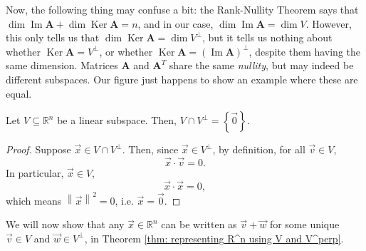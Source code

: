 \documentclass[]{book}
\DeclareMathOperator{\image}{Im}
\DeclareMathOperator{\kernel}{Ker}
\newcommand{\mat}[1]{\ensuremath{\mathbf{#1}}}
\newcommand{\R}{\ensuremath{\mathbb{R}}}
\begin{document}
Now, the following thing may confuse a bit: the Rank-Nullity Theorem says that $\dim\image\mat{A} + \dim\kernel\mat{A} = n$, and in our case, $\dim\image\mat{A} = \dim V$. However, this only tells us that $\dim\kernel\mat{A} = \dim V^{\perp}$, but it tells us nothing about whether $\kernel\mat{A} = V^{\perp}$, or whether $\kernel\mat{A} = \left(\image\mat{A}\right)^{\perp}$, despite them having the same dimension. Matrices $\mat{A}$ and $\mat{A}^T$ share the same \textit{nullity}, but may indeed be different subspaces. Our figure just happens to show an example where these are equal.


\begin{theorem}
    \label{thm: intersection of a subspace and its orthogonal complement}
    Let $V \subseteq \R^n$ be a linear subspace. Then, $V \cap V^{\perp} = \left\{\vec{0}\right\}$. 
\begin{proof}
    Suppose $\vec{x} \in V \cap V^{\perp}$. Then, since $\vec{x} \in V^{\perp}$, by definition, for all $\vec{v} \in V$, \[\vec{x} \cdot \vec{v} = 0.\]
    In particular, $\vec{x} \in V$, 
    \[\vec{x} \cdot \vec{x} = 0,\]
    which means $\left\|\vec{x}\right\|^2 = 0$, i.e. $\vec{x} = \vec{0}$. 
\end{proof}
\end{theorem}

We will now show that any $\vec{x} \in \R^n$ can be written as $\vec{v} + \vec{w}$ for some unique $\vec{v} \in V$ and $\vec{w} \in V^{\perp}$, in Theorem \ref{thm: representing R^n using V and V^perp}.
\end{document}
